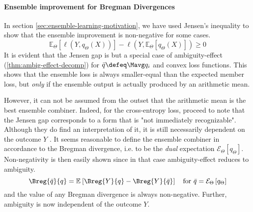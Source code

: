 \documentclass[../main.tex]{subfiles}
\begin{document}



\paragraph{Ensemble improvement for Bregman Divergences}

In section \ref{sec:ensemble-learning-motivation}, we have used Jensen's inequality to show that the ensemble improvement is non-negative for some cases.
$$
\mathbb{E}_{{\Theta}}\left[ \ell (Y, q_{\Theta}(X)) \right]  -
\ell(Y, \mathbb{E}_{\Theta}\left[ q_{\Theta}(X) \right]) \geq 0
$$
It is evident that the Jensen gap is but a special case of ambiguity-effect (\cf \ref{thm:ambig-effect-decomp}) for $\bar{q} \defeq \Mavg q_{i}$ and convex loss functions. 
This shows that the ensemble loss is always smaller-equal than the expected member loss, but \textit{only} if the ensemble output is actually produced by an arithmetic mean. 

However, it can not be assumed from the outset that the arithmetic mean is the best ensemble combiner. Indeed, for the cross-entropy loss, \citeauthor{abe_PathologiesPredictiveDiversity_2023} \cite{abe_PathologiesPredictiveDiversity_2023} proceed to note that the Jensen gap corresponds to a form that is "not immediately recognizable". Although they do find an interpretation of it, it is still necessarily dependent on the outcome $Y$ 
.
It seems reasonable to define the ensemble combiner in accordance to the Bregman divergence, i.e. to be the \textit{dual} expectation $\mathcal{E}_{\Theta}\left[ q_{\Theta} \right]$. 
Non-negativity is then easily shown since in that case ambiguity-effect reduces to ambiguity.
$$
\Breg{\bar{q}}{q} = \mathbb{E}_{}\left[ \Breg{Y}{q} - \Breg{Y}{\bar{q}} \right]
\hspace{1em} \text{for $\bar{q} = \mathcal{E}_\Theta\left[q_\Theta\right]$}
$$ and the value of any Bregman divergence is always non-negative. Further, ambiguity is now independent of the outcome $Y$.
\end{document}
